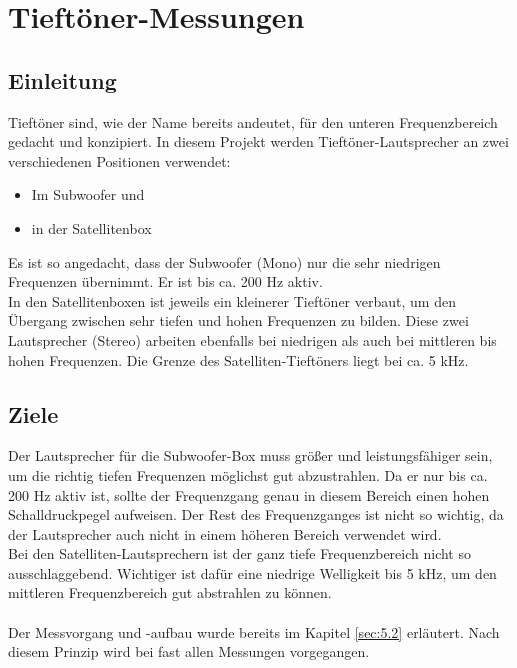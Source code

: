 \section{Tieftöner-Messungen} \label{sec:5.3}
\subsection{Einleitung} \label{subsec:5.3.1}
Tieftöner sind, wie der Name bereits andeutet, für den unteren Frequenzbereich gedacht und konzipiert.
In diesem Projekt werden Tieftöner-Lautsprecher an zwei verschiedenen Positionen verwendet:
\begin{itemize}
	\item Im Subwoofer und 
	\item in der Satellitenbox
\end{itemize}
Es ist so angedacht, dass der Subwoofer (Mono) nur die sehr niedrigen Frequenzen übernimmt.
Er ist bis ca. 200 Hz aktiv.\\
In den Satellitenboxen ist jeweils ein kleinerer Tieftöner verbaut, um den Übergang zwischen sehr tiefen und hohen Frequenzen zu bilden.
Diese zwei Lautsprecher (Stereo) arbeiten ebenfalls bei niedrigen als auch bei mittleren bis hohen Frequenzen.
Die Grenze des Satelliten-Tieftöners liegt bei ca. 5 kHz.

\subsection{Ziele} \label{subsec:5.3.2}
Der Lautsprecher für die Subwoofer-Box muss größer und leistungsfähiger sein, um die richtig tiefen Frequenzen möglichst gut abzustrahlen.
Da er nur bis ca. 200 Hz aktiv ist, sollte der Frequenzgang genau in diesem Bereich einen hohen Schalldruckpegel aufweisen.
Der Rest des Frequenzganges ist nicht so wichtig, da der Lautsprecher auch nicht in einem höheren Bereich verwendet wird. \\
Bei den Satelliten-Lautsprechern ist der ganz tiefe Frequenzbereich nicht so ausschlaggebend.
Wichtiger ist dafür eine niedrige Welligkeit bis 5 kHz, um den mittleren Frequenzbereich gut abstrahlen zu können.\\ \\
Der Messvorgang und -aufbau wurde bereits im Kapitel \ref{sec:5.2} erläutert.
Nach diesem Prinzip wird bei fast allen Messungen vorgegangen.

\newpage

